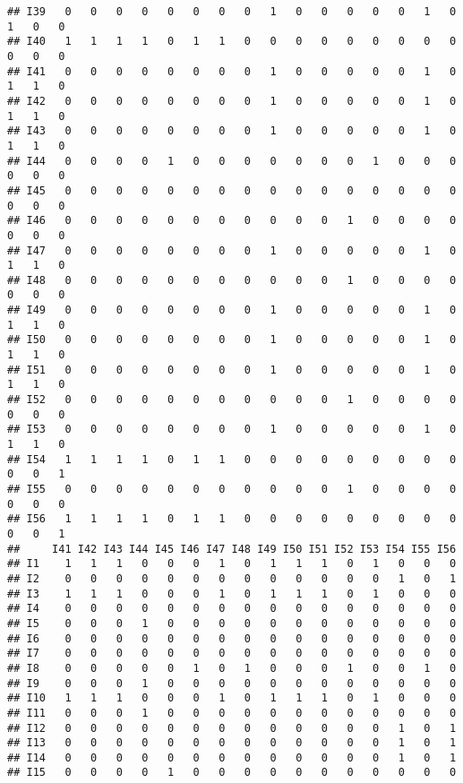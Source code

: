 \documentclass[
]{article}
\begin{document}
\begin{verbatim}
## I39   0   0   0   0   0   0   0   0   1   0   0   0   0   0   1   0   1   0   0
## I40   1   1   1   1   0   1   1   0   0   0   0   0   0   0   0   0   0   0   0
## I41   0   0   0   0   0   0   0   0   1   0   0   0   0   0   1   0   1   1   0
## I42   0   0   0   0   0   0   0   0   1   0   0   0   0   0   1   0   1   1   0
## I43   0   0   0   0   0   0   0   0   1   0   0   0   0   0   1   0   1   1   0
## I44   0   0   0   0   1   0   0   0   0   0   0   0   1   0   0   0   0   0   0
## I45   0   0   0   0   0   0   0   0   0   0   0   0   0   0   0   0   0   0   0
## I46   0   0   0   0   0   0   0   0   0   0   0   1   0   0   0   0   0   0   0
## I47   0   0   0   0   0   0   0   0   1   0   0   0   0   0   1   0   1   1   0
## I48   0   0   0   0   0   0   0   0   0   0   0   1   0   0   0   0   0   0   0
## I49   0   0   0   0   0   0   0   0   1   0   0   0   0   0   1   0   1   1   0
## I50   0   0   0   0   0   0   0   0   1   0   0   0   0   0   1   0   1   1   0
## I51   0   0   0   0   0   0   0   0   1   0   0   0   0   0   1   0   1   1   0
## I52   0   0   0   0   0   0   0   0   0   0   0   1   0   0   0   0   0   0   0
## I53   0   0   0   0   0   0   0   0   1   0   0   0   0   0   1   0   1   1   0
## I54   1   1   1   1   0   1   1   0   0   0   0   0   0   0   0   0   0   0   1
## I55   0   0   0   0   0   0   0   0   0   0   0   1   0   0   0   0   0   0   0
## I56   1   1   1   1   0   1   1   0   0   0   0   0   0   0   0   0   0   0   1
##     I41 I42 I43 I44 I45 I46 I47 I48 I49 I50 I51 I52 I53 I54 I55 I56
## I1    1   1   1   0   0   0   1   0   1   1   1   0   1   0   0   0
## I2    0   0   0   0   0   0   0   0   0   0   0   0   0   1   0   1
## I3    1   1   1   0   0   0   1   0   1   1   1   0   1   0   0   0
## I4    0   0   0   0   0   0   0   0   0   0   0   0   0   0   0   0
## I5    0   0   0   1   0   0   0   0   0   0   0   0   0   0   0   0
## I6    0   0   0   0   0   0   0   0   0   0   0   0   0   0   0   0
## I7    0   0   0   0   0   0   0   0   0   0   0   0   0   0   0   0
## I8    0   0   0   0   0   1   0   1   0   0   0   1   0   0   1   0
## I9    0   0   0   1   0   0   0   0   0   0   0   0   0   0   0   0
## I10   1   1   1   0   0   0   1   0   1   1   1   0   1   0   0   0
## I11   0   0   0   1   0   0   0   0   0   0   0   0   0   0   0   0
## I12   0   0   0   0   0   0   0   0   0   0   0   0   0   1   0   1
## I13   0   0   0   0   0   0   0   0   0   0   0   0   0   1   0   1
## I14   0   0   0   0   0   0   0   0   0   0   0   0   0   1   0   1
## I15   0   0   0   0   1   0   0   0   0   0   0   0   0   0   0   0

\end{verbatim}
\end{document}
